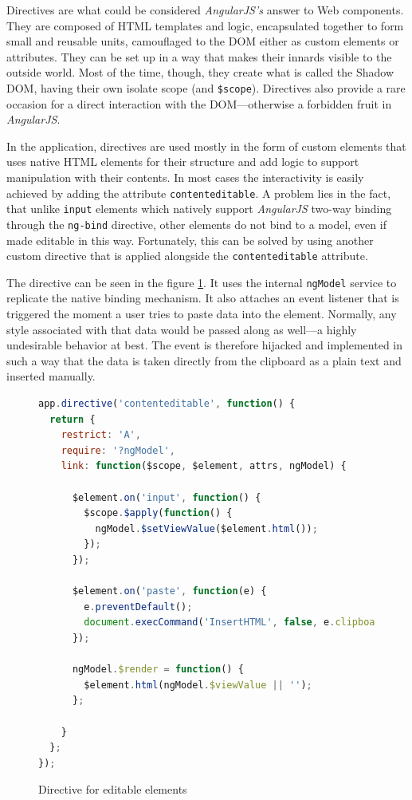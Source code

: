 \documentclass[thesis=M,english,hidelinks]{FITthesis}[2012/10/20]
\newcommand{\code}{\texttt}
\begin{document}
Directives are what could be considered \textit{AngularJS's} answer to Web components. They are composed of HTML templates and logic, encapsulated together to form small and reusable units, camouflaged to the DOM either as custom elements or attributes. They can be set up in a way that makes their innards visible to the outside world. Most of the time, though, they create what is called the Shadow DOM, having their own isolate scope (and \code{\$scope}). Directives also provide a rare occasion for a direct interaction with the DOM---otherwise a forbidden fruit in \textit{AngularJS}.

In the application, directives are used mostly in the form of custom elements that uses native HTML elements for their structure and add logic to support manipulation with their contents. In most cases the interactivity is easily achieved by adding the attribute \code{contenteditable}. A problem lies in the fact, that unlike \code{input} elements which natively support \textit{AngularJS} two-way binding through the \code{ng-bind} directive, other elements do not bind to a model, even if made editable in this way. Fortunately, this can be solved by using another custom directive that is applied alongside the \code{contenteditable} attribute.

The directive can be seen in the figure \ref{fig:contenteditable_directive}. It uses the internal \code{ngModel} service to replicate the native binding mechanism. It also attaches an event listener that is triggered the moment a user tries to paste data into the element. Normally, any style associated with that data would be passed along as well---a highly undesirable behavior at best. The event is therefore hijacked and implemented in such a way that the data is taken directly from the clipboard as a plain text and inserted manually.

\begin{figure}[h]
  \begin{lstlisting}[language=JavaScript]
app.directive('contenteditable', function() {
  return {
    restrict: 'A',
    require: '?ngModel',
    link: function($scope, $element, attrs, ngModel) {

      $element.on('input', function() {
        $scope.$apply(function() {
          ngModel.$setViewValue($element.html());
        });
      });

      $element.on('paste', function(e) {
        e.preventDefault();
        document.execCommand('InsertHTML', false, e.clipboardData.getData('text/plain'));
      });

      ngModel.$render = function() {
        $element.html(ngModel.$viewValue || '');
      };

    }
  };
});
  \end{lstlisting}
  \caption{Directive for editable elements}
  \label{fig:contenteditable_directive}
\end{figure}
\end{document}
